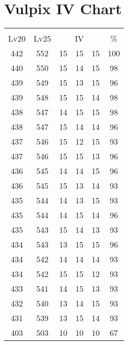 \documentclass{article}%
\begin{document}
%
\normalsize%
\section{Vulpix IV Chart}%
\label{sec:Vulpix IV Chart}%
\renewcommand{\arraystretch}{1.5}%
\begin{tabular}{|c|c|c|c|c|c|}%
\hline%
\multicolumn{6}{|c|}{\textcolor{white}{ 
\linebreak{Vulpix}
}%
\cellcolor{black}}\\%
\multicolumn{1}{|c}{Lv20}&\multicolumn{1}{c|}{Lv25}&\multicolumn{3}{c|}{IV}&\multicolumn{1}{|c|}{\%}\\%
\hline%
\rowcolor{color100}%
442&552&15&15&15&100\\%
\hline%
\rowcolor{color98}%
440&550&15&14&15&98\\%
\hline%
\rowcolor{color96}%
439&549&15&13&15&96\\%
\hline%
\rowcolor{color98}%
439&548&15&15&14&98\\%
\hline%
\rowcolor{color98}%
438&547&14&15&15&98\\%
\hline%
\rowcolor{color96}%
438&547&15&14&14&96\\%
\hline%
\rowcolor{color93}%
437&546&15&12&15&93\\%
\hline%
\rowcolor{color96}%
437&546&15&15&13&96\\%
\hline%
\rowcolor{color96}%
436&545&14&14&15&96\\%
\hline%
\rowcolor{color93}%
436&545&15&13&14&93\\%
\hline%
\rowcolor{color93}%
435&544&14&13&15&93\\%
\hline%
\rowcolor{color96}%
435&544&14&15&14&96\\%
\hline%
\rowcolor{color93}%
435&543&15&14&13&93\\%
\hline%
\rowcolor{color96}%
434&543&13&15&15&96\\%
\hline%
\rowcolor{color93}%
434&542&14&14&14&93\\%
\hline%
\rowcolor{color93}%
434&542&15&15&12&93\\%
\hline%
\rowcolor{color93}%
433&541&14&15&13&93\\%
\hline%
\rowcolor{color93}%
432&540&13&14&15&93\\%
\hline%
\rowcolor{color93}%
431&539&13&15&14&93\\%
\hline%
\rowcolor{color91}%
403&503&10&10&10&67\\%
\end{tabular}

%
\end{document}
